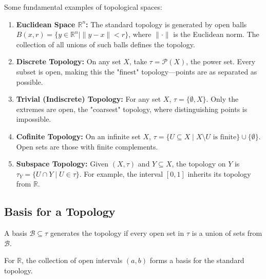 \begin{example}
Some fundamental examples of topological spaces:

\begin{enumerate}
    \item \textbf{Euclidean Space $\mathbb{R}^n$:} The standard topology is generated by open balls $B(x,r) = \{y \in \mathbb{R}^n \mid \|y-x\| < r\}$, where $\|\cdot\|$ is the Euclidean norm. The collection of all unions of such balls defines the topology.
    
    \item \textbf{Discrete Topology:} On any set $X$, take $\tau = \mathcal{P}(X)$, the power set. Every subset is open, making this the "finest" topology—points are as separated as possible.
    
    \item \textbf{Trivial (Indiscrete) Topology:} For any set $X$, $\tau = \{\emptyset, X\}$. Only the extremes are open, the "coarsest" topology, where distinguishing points is impossible.
    
    \item \textbf{Cofinite Topology:} On an infinite set $X$, $\tau = \{U \subseteq X \mid X \setminus U \text{ is finite}\} \cup \{\emptyset\}$. Open sets are those with finite complements.
    
    \item \textbf{Subspace Topology:} Given $(X,\tau)$ and $Y \subseteq X$, the topology on $Y$ is $\tau_Y = \{U \cap Y \mid U \in \tau\}$. For example, the interval $[0,1]$ inherits its topology from $\mathbb{R}$.
\end{enumerate}
\end{example}

\subsection{Basis for a Topology}

\begin{definition}
A basis $\mathcal{B} \subseteq \tau$ generates the topology if every open set in $\tau$ is a union of sets from $\mathcal{B}$. 
\end{definition}

\begin{example}
For $\mathbb{R}$, the collection of open intervals $(a,b)$ forms a basis for the standard topology.
\end{example}

